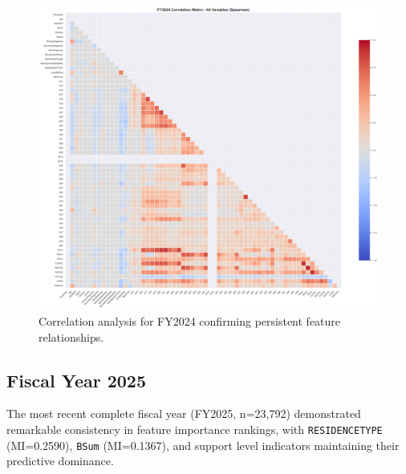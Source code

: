 \begin{figure}[htbp]
    \centering
    \includegraphics[width=\textwidth]{figures/fy2024_correlation_matrix_-_all_variables_(spearman).png}
    \caption{Correlation analysis for FY2024 confirming persistent feature relationships.}
    \label{fig:fy2024-corr-all}
\end{figure}

\newpage

\subsection{Fiscal Year 2025}
\label{subsec:fy2025}

The most recent complete fiscal year (FY2025, n=23,792) demonstrated remarkable consistency in feature importance rankings, with \texttt{RESIDENCETYPE} (MI=0.2590), \texttt{BSum} (MI=0.1367), and support level indicators maintaining their predictive dominance.

